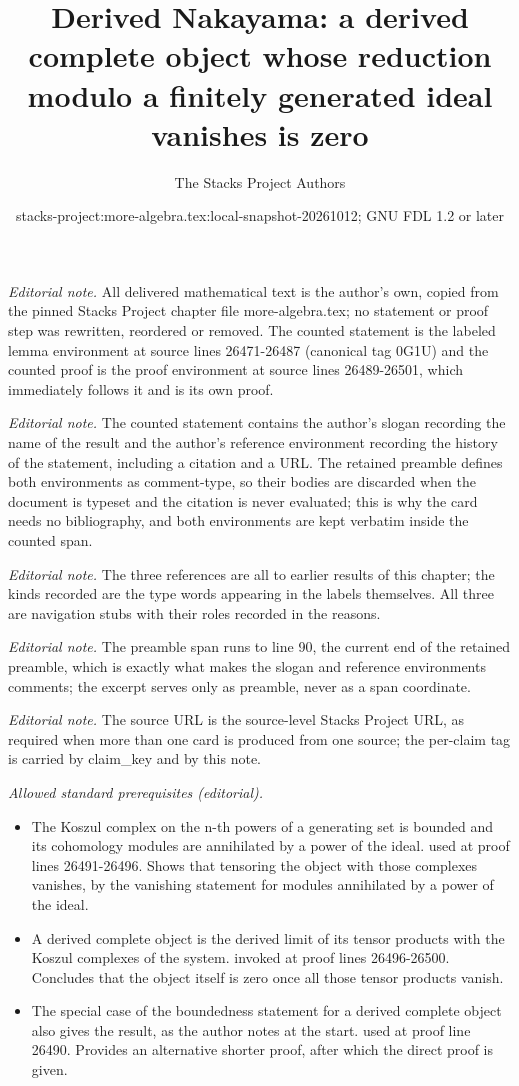 \documentclass[10pt,a4paper]{amsart}
\title{Derived Nakayama: a derived complete object whose reduction modulo a finitely generated ideal vanishes is zero}
\author{The Stacks Project Authors}
\date{stacks-project:more-algebra.tex:local-snapshot-20261012; GNU FDL 1.2 or later}
\theoremstyle{plain}
\theoremstyle{definition}
\theoremstyle{remark}
\numberwithin{equation}{subsection}
\begin{document}
\maketitle
\setcounter{subsection}{1}
\noindent\textit{Editorial note.} All delivered mathematical text is the author's own, copied from the pinned Stacks Project chapter file more-algebra.tex; no statement or proof step was rewritten, reordered or removed. The counted statement is the labeled lemma environment at source lines 26471-26487 (canonical tag 0G1U) and the counted proof is the proof environment at source lines 26489-26501, which immediately follows it and is its own proof.\par\medskip
\noindent\textit{Editorial note.} The counted statement contains the author's slogan recording the name of the result and the author's reference environment recording the history of the statement, including a citation and a URL. The retained preamble defines both environments as comment-type, so their bodies are discarded when the document is typeset and the citation is never evaluated; this is why the card needs no bibliography, and both environments are kept verbatim inside the counted span.\par\medskip
\noindent\textit{Editorial note.} The three references are all to earlier results of this chapter; the kinds recorded are the type words appearing in the labels themselves. All three are navigation stubs with their roles recorded in the reasons.\par\medskip
\noindent\textit{Editorial note.} The preamble span runs to line 90, the current end of the retained preamble, which is exactly what makes the slogan and reference environments comments; the excerpt serves only as preamble, never as a span coordinate.\par\medskip
\noindent\textit{Editorial note.} The source URL is the source-level Stacks Project URL, as required when more than one card is produced from one source; the per-claim tag is carried by claim\_key and by this note.\par\medskip
\noindent\textit{Allowed standard prerequisites (editorial).}\begin{itemize}
\item The Koszul complex on the n-th powers of a generating set is bounded and its cohomology modules are annihilated by a power of the ideal. used at proof lines 26491-26496. Shows that tensoring the object with those complexes vanishes, by the vanishing statement for modules annihilated by a power of the ideal.
\item A derived complete object is the derived limit of its tensor products with the Koszul complexes of the system. invoked at proof lines 26496-26500. Concludes that the object itself is zero once all those tensor products vanish.
\item The special case of the boundedness statement for a derived complete object also gives the result, as the author notes at the start. used at proof line 26490. Provides an alternative shorter proof, after which the direct proof is given.
\end{itemize}\medskip
\end{document}
